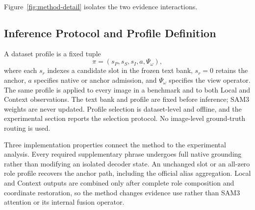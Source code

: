  Figure~\ref{fig:method-detail} isolates the two evidence interactions.

\subsection{Inference Protocol and Profile Definition}

A dataset profile is a fixed tuple
\begin{equation}
\pi=(s_P,s_S,s_I,a,\Psi_{\omega}),
\label{eq:profile}
\end{equation}
where each $s_r$ indexes a candidate slot in the frozen text bank, $s_r=0$ retains the anchor, $a$ specifies native or anchor admission, and $\Psi_{\omega}$ specifies the view operator. The same profile is applied to every image in a benchmark and to both Local and Context observations. The text bank and profile are fixed before inference; SAM3 weights are never updated. Profile selection is dataset-level and offline, and the experimental section reports the selection protocol. No image-level ground-truth routing is used.

Three implementation properties connect the method to the experimental analysis. Every required supplementary phrase undergoes full native grounding rather than modifying an isolated decoder state. An unchanged slot or an all-zero role profile recovers the anchor path, including the official alias aggregation. Local and Context outputs are combined only after complete role composition and coordinate restoration, so the method changes evidence use rather than SAM3 attention or its internal fusion operator.

